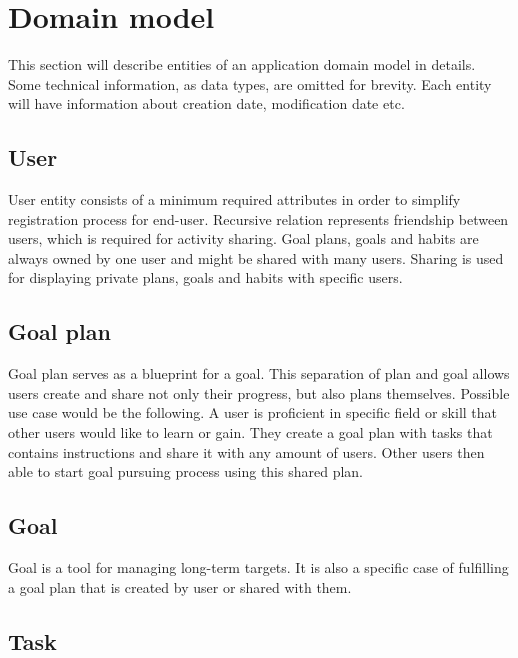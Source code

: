 
\section{Domain model}\label{sec:domain-model}

This section will describe entities of an application domain model in details.
Some technical information, as data types, are omitted for brevity.
Each entity will have information about creation date, modification date etc.

\subsection{User}\label{subsec:user}

User entity consists of a minimum required attributes in order to simplify registration process for end-user.
Recursive relation represents friendship between users, which is required for activity sharing.
Goal plans, goals and habits are always owned by one user and might be shared with many users.
Sharing is used for displaying private plans, goals and habits with specific users.

\subsection{Goal plan}\label{subsec:goal-plan}

Goal plan serves as a blueprint for a goal.
This separation of plan and goal allows users create and share not only their progress, but also plans themselves.
Possible use case would be the following.
A user is proficient in specific field or skill that other users would like to learn or gain.
They create a goal plan with tasks that contains instructions and share it with any amount of users.
Other users then able to start goal pursuing process using this shared plan.

\subsection{Goal}\label{subsec:goal}

Goal is a tool for managing long-term targets.
It is also a specific case of fulfilling a goal plan that is created by user or shared with them.

\subsection{Task}\label{subsec:task}

